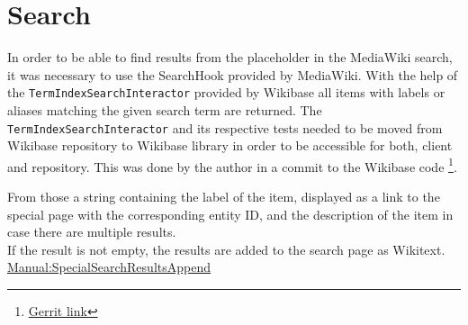 \section{Search}
In order to be able to find results from the placeholder in the MediaWiki search, it was necessary to use the SearchHook provided by MediaWiki.
With the help of the \texttt{TermIndexSearchInteractor} provided by Wikibase all items with labels or aliases matching the given search term are returned. The \texttt{TermIndexSearchInteractor} and its respective tests needed to be moved from Wikibase repository to Wikibase library in order to be accessible for both, client and repository. This was done by the author in a commit to the Wikibase code \footnote{\href{https://gerrit.wikimedia.org/r/\#/c/243723/}{Gerrit link}}.

From those a string containing the label of the item, displayed as a link to the special page with the corresponding entity ID, and the description of the item in case there are multiple results.  \\
If the result is not empty, the results are added to the search page as Wikitext. \\
\href{https://www.mediawiki.org/wiki/Manual:Hooks/SpecialSearchResultsAppend}{Manual:SpecialSearchResultsAppend}